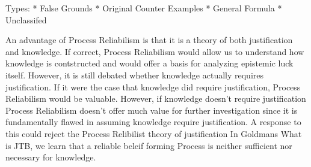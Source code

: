 \documentclass{article}
\begin{document}
Types:
* False Grounds
* Original Counter Examples
* General Formula
* Unclassifed

An advantage of Process Reliabilism is that it is a theory of both
justification and knowledge. If correct, Process Reliabilism would
allow us to understand how knowledge is contstructed and would
offer a basis for analyzing epistemic luck itself. %
However, it is still debated whether knowledge actually requires justification.
If it were the case that knowledge did require justification, Process Reliabilism
would be valuable. However, if knowledge doesn't require justification
Process Reliabilism doesn't offer much value for further investigation
since it is fundamentally flawed in assuming knowledge require justification.
A response to this could reject the Process Relibilist theory of justification
In Goldmans What is JTB, we learn that a reliable beleif forming Process
is neither sufficient nor necessary for knowledge.

\end{document}
